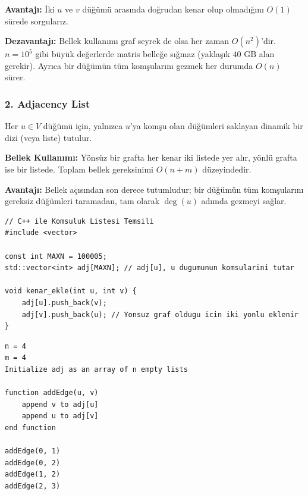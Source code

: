 \textbf{Avantajı:} İki $u$ ve $v$ düğümü arasında doğrudan kenar olup olmadığını $O(1)$ sürede sorgularız.

\textbf{Dezavantajı:} Bellek kullanımı graf seyrek de olsa her zaman $O(n^2)$'dir. $n = 10^5$ gibi büyük değerlerde matris belleğe sığmaz (yaklaşık $40\text{ GB}$ alan gerekir). Ayrıca bir düğümün tüm komşularını gezmek her durumda $O(n)$ sürer.

\subsubsection{2. Adjacency List}
Her $u \in V$ düğümü için, yalnızca $u$'ya komşu olan düğümleri saklayan dinamik bir dizi (veya liste) tutulur.

\textbf{Bellek Kullanımı:} Yönsüz bir grafta her kenar iki listede yer alır, yönlü grafta ise bir listede. Toplam bellek gereksinimi $O(n + m)$ düzeyindedir.

\textbf{Avantajı:} Bellek açısından son derece tutumludur; bir düğümün tüm komşularını gereksiz düğümleri taramadan, tam olarak $\deg(u)$ adımda gezmeyi sağlar.

\begin{lstlisting}[language=CppTemel]
// C++ ile Komsuluk Listesi Temsili
#include <vector>

const int MAXN = 100005;
std::vector<int> adj[MAXN]; // adj[u], u dugumunun komsularini tutar

void kenar_ekle(int u, int v) {
    adj[u].push_back(v);
    adj[v].push_back(u); // Yonsuz graf oldugu icin iki yonlu eklenir
}
\end{lstlisting}

\begin{lstlisting}
n = 4
m = 4
Initialize adj as an array of n empty lists

function addEdge(u, v)
    append v to adj[u]
    append u to adj[v]
end function

addEdge(0, 1)
addEdge(0, 2)
addEdge(1, 2)
addEdge(2, 3)\end{lstlisting}


